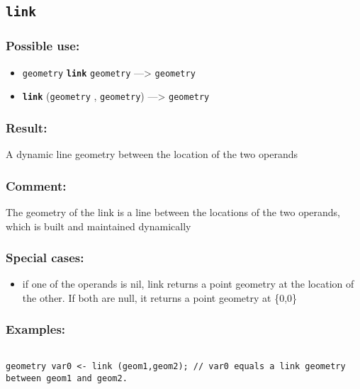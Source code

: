 \documentclass[]{book}
\providecommand{\tightlist}{%
  \setlength{\itemsep}{0pt}\setlength{\parskip}{0pt}}
\theoremstyle{definition}
\theoremstyle{definition}
\theoremstyle{definition}
\theoremstyle{remark}
\begin{document}
\subsection{\texorpdfstring{\texttt{link}}{link}}\label{link}

\subsubsection{Possible use:}\label{possible-use-322}

\begin{itemize}
\tightlist
\item
  \texttt{geometry} \textbf{\texttt{link}} \texttt{geometry}
  ---\textgreater{} \texttt{geometry}
\item
  \textbf{\texttt{link}} (\texttt{geometry} , \texttt{geometry})
  ---\textgreater{} \texttt{geometry}
\end{itemize}

\subsubsection{Result:}\label{result-312}

A dynamic line geometry between the location of the two operands

\subsubsection{Comment:}\label{comment-60}

The geometry of the link is a line between the locations of the two
operands, which is built and maintained dynamically

\subsubsection{Special cases:}\label{special-cases-89}

\begin{itemize}
\tightlist
\item
  if one of the operands is nil, link returns a point geometry at the
  location of the other. If both are null, it returns a point geometry
  at \{0,0\}
\end{itemize}

\subsubsection{Examples:}\label{examples-224}

\begin{verbatim}
 
geometry var0 <- link (geom1,geom2); // var0 equals a link geometry between geom1 and geom2.
\end{verbatim}
\end{document}
